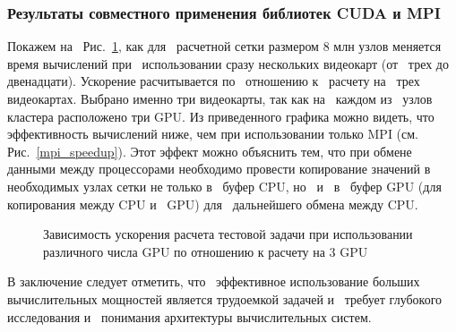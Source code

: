 \subsubsection{Результаты совместного применения библиотек CUDA и MPI}

Покажем на~ Рис.~\ref{many_gpu}, как для~ расчетной сетки размером 8 млн узлов меняется время вычислений
при~ использовании сразу нескольких видеокарт (от~ трех до~ двенадцати). Ускорение расчитывается по~ отношению
к~ расчету на~ трех видеокартах.
Выбрано именно три видеокарты, так как на~ каждом из~ узлов кластера расположено три GPU. Из приведенного графика можно видеть,
что эффективность вычислений ниже, чем при использовании только MPI (см. Рис.~\ref{mpi_speedup}). Этот эффект можно
объяснить тем, что при обмене данными между процессорами необходимо провести копирование значений в~ необходимых
узлах сетки не только в~ буфер CPU, но~ и~ в~ буфер GPU (для~ копирования между CPU и~ GPU) для~ дальнейшего обмена между CPU.

\begin{figure}[!h]
\begin{center}
\caption{Зависимость ускорения расчета тестовой задачи при использовании различного числа GPU по отношению к расчету на 3 GPU}
\label{many_gpu}
\end{center}
\end{figure}

В заключение следует отметить, что~ эффективное использование больших вычислительных
мощностей является трудоемкой задачей и~ требует глубокого исследования и~ понимания
архитектуры вычислительных систем.
